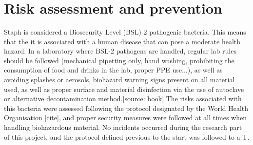 \section{Risk assessment and prevention}
\paragraph{}Staph is considered a Biosecurity Level (BSL) 2 pathogenic bacteria. This means that the it is associated with a human disease that can pose a moderate health hazard. In a laboratory where BSL-2 pathogens are handled, regular lab rules should be followed (mechanical pipetting only, hand washing, prohibiting the consumption of food and drinks in the lab, proper PPE use...), as well as avoiding splashes or aerosols, biohazard warning signs present on all material used, as well as proper surface and material disinfection via the use of autoclave or alternative decontamination method.[source: book] The risks associated with this bacteria were assessed following the protocol designated by the World Health Organisation [cite], and proper security measures were followed at all times when handling biohazardous material. No incidents occurred during the research part of this project, and the protocol defined previous to the start was followed to a T.


